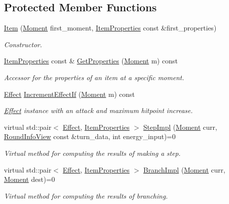 \subsection*{Protected Member Functions}
\begin{DoxyCompactItemize}
\item 
\hyperlink{classitem_1_1_item_aebe9569e9074ee805b6213f500066115}{Item} (\hyperlink{classtimeplane_1_1_moment}{Moment} first\+\_\+moment, \hyperlink{classitem_1_1_item_properties}{Item\+Properties} const \&first\+\_\+properties)
\begin{DoxyCompactList}\small\item\em Constructor. \end{DoxyCompactList}\item 
\hyperlink{classitem_1_1_item_properties}{Item\+Properties} const  \& \hyperlink{classitem_1_1_item_a23790dceafc9e3f8950f69380cc4c4aa}{Get\+Properties} (\hyperlink{classtimeplane_1_1_moment}{Moment} m) const
\begin{DoxyCompactList}\small\item\em Accessor for the properties of an item at a specific moment. \end{DoxyCompactList}\item 
\hyperlink{classitem_1_1_effect}{Effect} \hyperlink{classitem_1_1_item_a35583f2bcdaea50728a9e16e0626e341}{Increment\+Effect\+If} (\hyperlink{classtimeplane_1_1_moment}{Moment} m) const
\begin{DoxyCompactList}\small\item\em {\ttfamily \hyperlink{classitem_1_1_effect}{Effect}} instance with an attack and maximum hitpoint increase. \end{DoxyCompactList}\item 
virtual std\+::pair$<$ \hyperlink{classitem_1_1_effect}{Effect}, \hyperlink{classitem_1_1_item_properties}{Item\+Properties} $>$ \hyperlink{classitem_1_1_item_a90df61c8a2a20144eb1100af5fb2d464}{Step\+Impl} (\hyperlink{classtimeplane_1_1_moment}{Moment} curr, \hyperlink{classroundinfo_1_1_round_info_view}{Round\+Info\+View} const \&turn\+\_\+data, int energy\+\_\+input)=0
\begin{DoxyCompactList}\small\item\em Virtual method for computing the results of making a step. \end{DoxyCompactList}\item 
virtual std\+::pair$<$ \hyperlink{classitem_1_1_effect}{Effect}, \hyperlink{classitem_1_1_item_properties}{Item\+Properties} $>$ \hyperlink{classitem_1_1_item_afef6bdd5c1c734c67122e4118e9e1930}{Branch\+Impl} (\hyperlink{classtimeplane_1_1_moment}{Moment} curr, \hyperlink{classtimeplane_1_1_moment}{Moment} dest)=0
\begin{DoxyCompactList}\small\item\em Virtual method for computing the results of branching. \end{DoxyCompactList}\end{DoxyCompactItemize}
